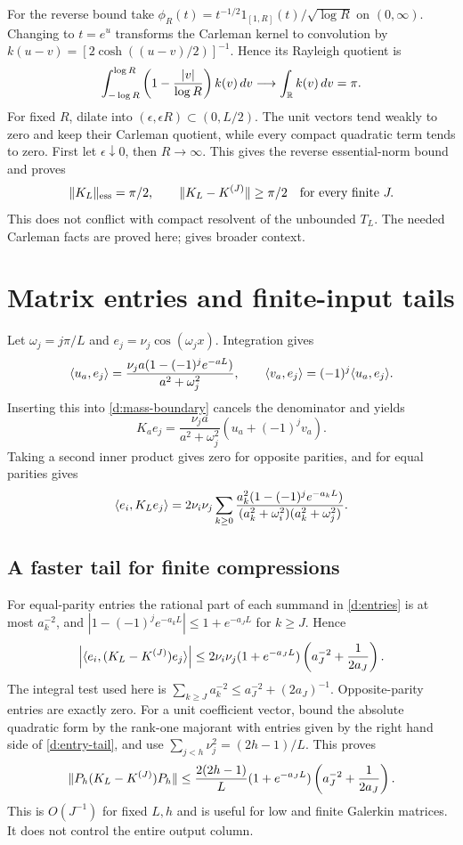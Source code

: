 For the reverse bound take
$\phi_R(t)=t^{-1/2}1_{[1,R]}(t)/\sqrt{\log R}$ on $(0,\infty)$.
Changing to $t=e^u$ transforms the Carleman kernel to convolution by
$k(u-v)=[2\cosh((u-v)/2)]^{-1}$. Hence its Rayleigh quotient is
\[
\int_{-\log R}^{\log R}
\left(1-\frac{|v|}{\log R}\right)k(v)\,dv\longrightarrow
\int_\mathbb R k(v)\,dv=\pi.
\]
For fixed $R$, dilate into $(\epsilon,\epsilon R)\subset(0,L/2)$.
The unit vectors tend weakly to zero and keep their Carleman quotient,
while every compact quadratic term tends to zero. First let
$\epsilon\downarrow0$, then $R\to\infty$. This gives the reverse
essential-norm bound and proves
\[
\lVert K_L\rVert_{\rm ess}=\pi/2,\qquad
\lVert K_L-K^{(J)}\rVert\ge\pi/2\quad\text{for every finite }J.
\]
This does not conflict with compact resolvent of the unbounded $T_L$.
The needed Carleman facts are proved here; \cite{Yafaev} gives broader context.

\section{Matrix entries and finite-input tails}
Let $\omega_j=j\pi/L$ and $e_j=\nu_j\cos(\omega_jx)$. Integration gives
\[
\langle u_a,e_j\rangle=\frac{\nu_ja(1-(-1)^je^{-aL})}{a^2+\omega_j^2},\qquad
\langle v_a,e_j\rangle=(-1)^j\langle u_a,e_j\rangle.
\]
Inserting this into \eqref{d:mass-boundary} cancels the denominator and yields
\begin{equation}\label{d:column}
K_ae_j=\frac{\nu_ja}{a^2+\omega_j^2}(u_a+(-1)^jv_a).
\end{equation}
Taking a second inner product gives zero for opposite parities, and for
equal parities gives
\begin{equation}\label{d:entries}
\langle e_i,K_Le_j\rangle=2\nu_i\nu_j\sum_{k\ge0}
\frac{a_k^2(1-(-1)^je^{-a_kL})}
{(a_k^2+\omega_i^2)(a_k^2+\omega_j^2)}.
\end{equation}
\subsection{A faster tail for finite compressions}
For equal-parity entries the rational part of each summand in
\eqref{d:entries} is at most $a_k^{-2}$, and
$|1-(-1)^je^{-a_kL}|\le1+e^{-a_JL}$ for $k\ge J$. Hence
\begin{equation}\label{d:entry-tail}
\left|\langle e_i,(K_L-K^{(J)})e_j\rangle\right|
\le2\nu_i\nu_j(1+e^{-a_JL})
\left(a_J^{-2}+\frac1{2a_J}\right).
\end{equation}
The integral test used here is
$\sum_{k\ge J}a_k^{-2}\le a_J^{-2}+(2a_J)^{-1}$.
Opposite-parity entries are exactly zero. For a unit coefficient vector,
bound the absolute quadratic form by the rank-one majorant with entries
given by the right hand side of \eqref{d:entry-tail}, and use
$\sum_{j<h}\nu_j^2=(2h-1)/L$. This proves
\begin{equation}\label{d:compression-tail}
\lVert P_h(K_L-K^{(J)})P_h\rVert
\le\frac{2(2h-1)}L(1+e^{-a_JL})
\left(a_J^{-2}+\frac1{2a_J}\right).
\end{equation}
This is $O(J^{-1})$ for fixed $L,h$ and is useful for low and finite
Galerkin matrices. It does not control the entire output column.

